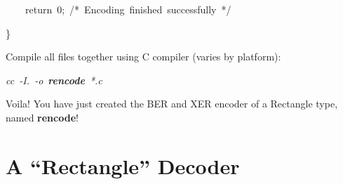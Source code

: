 \documentclass[english,oneside,12pt]{book}
\newenvironment{lyxcode}
{\par\begin{list}{}{
\setlength{\rightmargin}{\leftmargin}
\setlength{\listparindent}{0pt}%
\raggedright
\setlength{\itemsep}{0pt}
\setlength{\parsep}{0pt}
\normalfont\ttfamily}%
 \item[]}
{\end{list}}
\begin{document}
\begin{enumerate}
\begin{lyxcode}
{\small{}~~~~return~0;~/{*}~Encoding~finished~successfully~{*}/}{\small \par}

{\small \}}{\small \par}
\end{lyxcode}
\item Compile all files together using C compiler (varies by platform):

\begin{lyxcode}
\emph{cc~-I.~-o}~\textbf{\emph{rencode}}~\emph{{*}.c}
\end{lyxcode}
\item Voila! You have just created the BER and XER encoder of a Rectangle
type, named \textbf{rencode}!
\end{enumerate}
\clearpage{}


\section{\label{sec:A-Rectangle-Decoder}A ``Rectangle'' Decoder}
\end{document}
